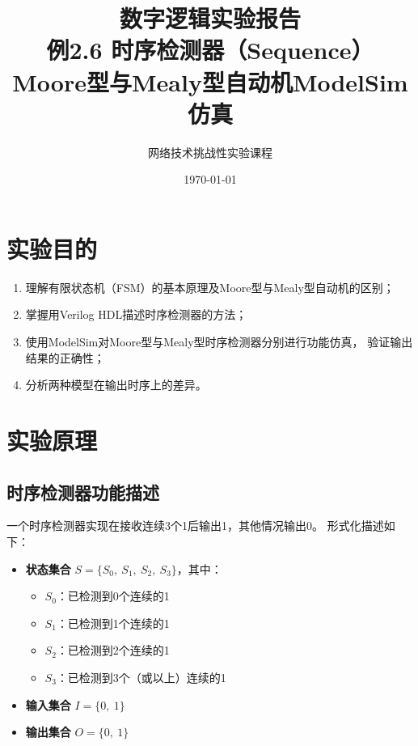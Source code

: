 \documentclass[12pt,a4paper]{article}
\title{\textbf{数字逻辑实验报告}\\[0.5em]
       \large 例2.6 时序检测器（Sequence）\\
       Moore型与Mealy型自动机ModelSim仿真}
\author{网络技术挑战性实验课程}
\date{\today}
\begin{document}
\maketitle
\tableofcontents
\newpage

\section{实验目的}

\begin{enumerate}
  \item 理解有限状态机（FSM）的基本原理及Moore型与Mealy型自动机的区别；
  \item 掌握用Verilog HDL描述时序检测器的方法；
  \item 使用ModelSim对Moore型与Mealy型时序检测器分别进行功能仿真，
        验证输出结果的正确性；
  \item 分析两种模型在输出时序上的差异。
\end{enumerate}

\section{实验原理}

\subsection{时序检测器功能描述}

一个时序检测器实现在接收连续3个1后输出1，其他情况输出0。
形式化描述如下：

\begin{itemize}
  \item \textbf{状态集合} $S = \{S_0,\ S_1,\ S_2,\ S_3\}$，其中：
    \begin{itemize}
      \item $S_0$：已检测到0个连续的1
      \item $S_1$：已检测到1个连续的1
      \item $S_2$：已检测到2个连续的1
      \item $S_3$：已检测到3个（或以上）连续的1
    \end{itemize}
  \item \textbf{输入集合} $I = \{0,\ 1\}$
  \item \textbf{输出集合} $O = \{0,\ 1\}$
\end{itemize}
\end{document}
